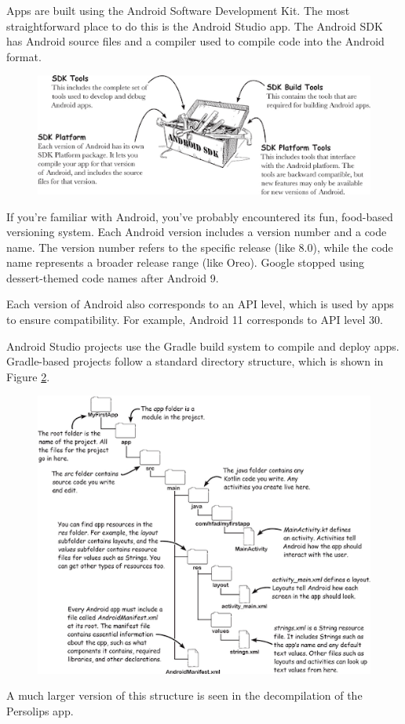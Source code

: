 Apps are built using the Android Software Development Kit. The most straightforward place to do this is the Android Studio app. The Android SDK has Android source files and a compiler used to compile code into the Android format.

\begin{figure}[H]
	\centering
	\includegraphics[width=0.7\linewidth]{android_sdk_tools.png}
	\caption{}
	\label{fig:androidsdktools}
\end{figure}

If you’re familiar with Android, you’ve probably encountered its fun, food-based versioning system. Each Android version includes a version number and a code name. The version number refers to the specific release (like 8.0), while the code name represents a broader release range (like Oreo). Google stopped using dessert-themed code names after Android 9.

Each version of Android also corresponds to an API level, which is used by apps to ensure compatibility. For example, Android 11 corresponds to API level 30.

Android Studio projects use the Gradle build system to compile and deploy apps. Gradle-based projects follow a standard directory structure, which is shown in Figure \ref{fig:gradlebuildstructure}.

\begin{figure}[H]
	\centering
	\includegraphics[width=0.7\linewidth]{gradle_build_structure.png}
	\caption{}
	\label{fig:gradlebuildstructure}
\end{figure}
A much larger version of this structure is seen in the decompilation of the Persolips app. 

